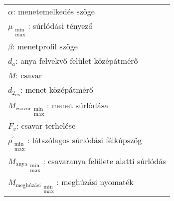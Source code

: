 \begin{center}
	\begin{tabular}{l}
		$\alpha$: menetemelkedés szöge \siunit{}{\degree} \\
		$\mu_{\substack{\text{min}\\\text{max}}}$: súrlódási tényező \siunit{}{-} \\
		$\beta$: menetprofil szöge \siunit{}{\degree} \\
		$d_a$: anya felvekvő felület középátmérő \siunit{}{\mm} \\
		$M$: csavar \siunit{}{\mm} \\
		${d_2}_\text{cs}$: menet középátmérő \siunit{}{\mm} \\
		${M_\text{csavar}}_{\substack{\text{min}\\\text{max}}}$: menet súrlódása \siunit{}{\newton\mm} \\
		$F_v$: csavar terhelése \siunit{}{\newton} \\
		$\rho^{'}_{\substack{\text{min}\\\text{max}}}$: látszólagos súrlódási félkúpszög \siunit{}{\degree} \\
		${M_\text{anya}}_{\substack{\text{min}\\\text{max}}}$: csavaranya felülete alatti súrlódás \siunit{}{\newton\mm} \\
		${M_\text{meghúzási}}_{\substack{\text{min}\\\text{max}}}$: meghúzási nyomaték \siunit{}{\newton\mm} \\
	\end{tabular}
\end{center}
